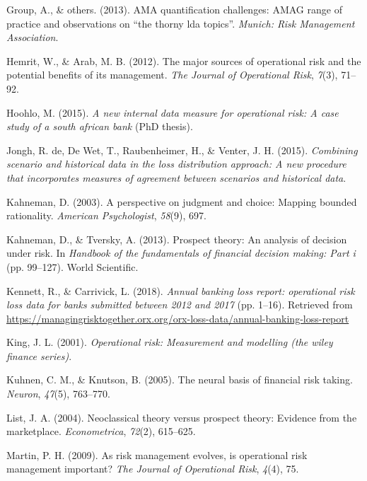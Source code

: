 \documentclass{DissertateUSU}
\begin{document}
\leavevmode\hypertarget{ref-ama2013ama}{}%
Group, A., \& others. (2013). AMA quantification challenges: AMAG range
of practice and observations on ``the thorny lda topics''. \emph{Munich:
Risk Management Association}.

\leavevmode\hypertarget{ref-hemrit2012major}{}%
Hemrit, W., \& Arab, M. B. (2012). The major sources of operational risk
and the potential benefits of its management. \emph{The Journal of
Operational Risk}, \emph{7}(3), 71--92.

\leavevmode\hypertarget{ref-hoohlo2015new}{}%
Hoohlo, M. (2015). \emph{A new internal data measure for operational
risk: A case study of a south african bank} (PhD thesis).

\leavevmode\hypertarget{ref-de2015combining}{}%
Jongh, R. de, De Wet, T., Raubenheimer, H., \& Venter, J. H. (2015).
\emph{Combining scenario and historical data in the loss distribution
approach: A new procedure that incorporates measures of agreement
between scenarios and historical data}.

\leavevmode\hypertarget{ref-kahneman2003perspective}{}%
Kahneman, D. (2003). A perspective on judgment and choice: Mapping
bounded rationality. \emph{American Psychologist}, \emph{58}(9), 697.

\leavevmode\hypertarget{ref-kahneman2013prospect}{}%
Kahneman, D., \& Tversky, A. (2013). Prospect theory: An analysis of
decision under risk. In \emph{Handbook of the fundamentals of financial
decision making: Part i} (pp. 99--127). World Scientific.

\leavevmode\hypertarget{ref-orxablr2018}{}%
Kennett, R., \& Carrivick, L. (2018). \emph{Annual banking loss report:
operational risk loss data for banks submitted between 2012 and 2017}
(pp. 1--16). Retrieved from
\url{https://managingrisktogether.orx.org/orx-loss-data/annual-banking-loss-report}

\leavevmode\hypertarget{ref-king2001operational}{}%
King, J. L. (2001). \emph{Operational risk: Measurement and modelling
(the wiley finance series)}.

\leavevmode\hypertarget{ref-kuhnen2005neural}{}%
Kuhnen, C. M., \& Knutson, B. (2005). The neural basis of financial risk
taking. \emph{Neuron}, \emph{47}(5), 763--770.

\leavevmode\hypertarget{ref-list2004neoclassical}{}%
List, J. A. (2004). Neoclassical theory versus prospect theory: Evidence
from the marketplace. \emph{Econometrica}, \emph{72}(2), 615--625.

\leavevmode\hypertarget{ref-martin2009risk}{}%
Martin, P. H. (2009). As risk management evolves, is operational risk
management important? \emph{The Journal of Operational Risk},
\emph{4}(4), 75.
\end{document}
